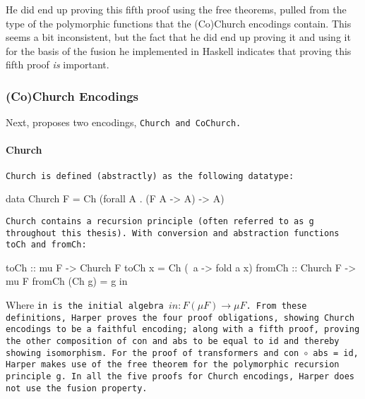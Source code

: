 He did end up proving this fifth proof using the free theorems, pulled from the type of the polymorphic functions that the (Co)Church encodings contain.
This seems a bit inconsistent, but the fact that he did end up proving it and using it for the basis of the fusion he implemented in Haskell indicates that proving this fifth proof \textit{is} important.

\subsubsection{(Co)Church Encodings}
Next, \cite{Harper2011} proposes two encodings, \tt{Church} and \tt{CoChurch}.

\paragraph{Church} \tt{Church} is defined (abstractly) as the following datatype:
\begin{code}
data Church F = Ch (forall A . (F A -> A) -> A)
\end{code}
\tt{Church} contains a recursion principle (often referred to as \tt{g} throughout this thesis).
With conversion and abstraction functions \tt{toCh} and \tt{fromCh}:
\begin{code}
toCh :: mu F -> Church F
toCh x = Ch (\ a -> fold a x)
fromCh :: Church F -> mu F
fromCh (Ch g) = g in
\end{code}
Where \tt{in} is the initial algebra $in:F(\mu F) \to \mu F$.
From these definitions, Harper proves the four proof obligations, showing Church encodings to be a faithful encoding; along with a fifth proof, proving the other composition of \tt{con} and \tt{abs} to be equal to \tt{id} and thereby showing isomorphism.
For the proof of transformers and \tt{con $\circ$ abs = id}, Harper makes use of the free theorem for the polymorphic recursion principle \tt{g}.
In all the five proofs for Church encodings, Harper does not use the fusion property.

